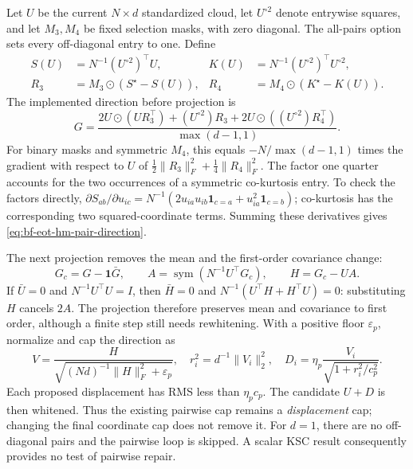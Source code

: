 Let \(U\) be the current \(N\times d\) standardized cloud, let
\(U^{\circ2}\) denote entrywise squares, and let \(M_3,M_4\) be fixed selection
masks, with zero diagonal.  The all-pairs option sets every off-diagonal entry
to one.  Define
\begin{align}
 S(U)&=N^{-1}(U^{\circ2})^\top U,&
 K(U)&=N^{-1}(U^{\circ2})^\top U^{\circ2},\\
 R_3&=M_3\odot(S^\star-S(U)),&
 R_4&=M_4\odot(K^\star-K(U)).
 \label{eq:bf-eot-hm-pair-residuals}
\end{align}
The implemented direction before projection is
\begin{equation}
 G=\frac{2U\odot(UR_3^\top)+(U^{\circ2})R_3
             +2U\odot((U^{\circ2})R_4^\top)}{\max(d-1,1)}.
 \label{eq:bf-eot-hm-pair-direction}
\end{equation}
For binary masks and symmetric \(M_4\), this equals
\(-N/\max(d-1,1)\) times the gradient with respect to \(U\) of
\(\tfrac12\lVert R_3\rVert_F^2+\tfrac14\lVert R_4\rVert_F^2\).
The factor one quarter accounts for the two occurrences of a symmetric
co-kurtosis entry.  To check the factors directly,
\(\partial S_{ab}/\partial u_{ic}
=N^{-1}(2u_{ia}u_{ib}\mathbf1_{c=a}+u_{ia}^2\mathbf1_{c=b})\);
co-kurtosis has the corresponding two squared-coordinate terms.  Summing
these derivatives gives \eqref{eq:bf-eot-hm-pair-direction}.

The next projection removes the mean and the first-order covariance change:
\begin{equation}
 G_c=G-\mathbf1\bar G,\qquad
 A=\operatorname{sym}(N^{-1}U^\top G_c),\qquad H=G_c-UA.
 \label{eq:bf-eot-hm-pair-projection}
\end{equation}
If \(\bar U=0\) and \(N^{-1}U^\top U=I\), then \(\bar H=0\) and
\(N^{-1}(U^\top H+H^\top U)=0\): substituting \(H\) cancels
\(2A\).  The projection therefore preserves mean and covariance to first
order, although a finite step still needs rewhitening.  With a positive floor
\(\varepsilon_p\), normalize and cap the direction as
\begin{equation}
 V=\frac{H}{\sqrt{(Nd)^{-1}\lVert H\rVert_F^2+\varepsilon_p}},\quad
 r_i^2=d^{-1}\lVert V_i\rVert_2^2,\quad
 D_i=\eta_p\frac{V_i}{\sqrt{1+r_i^2/c_p^2}}.
 \label{eq:bf-eot-hm-pair-cap}
\end{equation}
Each proposed displacement has RMS less than \(\eta_p c_p\).  The candidate
\(U+D\) is then whitened.  Thus the existing pairwise cap remains a
\emph{displacement} cap; changing the final coordinate cap does not remove it.
For \(d=1\), there are no off-diagonal pairs and the pairwise loop is skipped.
A scalar KSC result consequently provides no test of pairwise repair.

